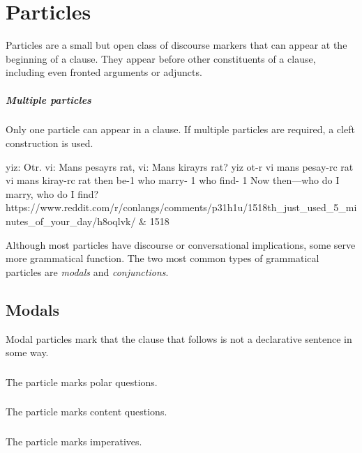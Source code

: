 \setchapterpreamble[u]{\margintoc}
\chapter{Particles}
Particles are a small but open class of discourse markers that can appear at the beginning of a clause. They appear before other constituents of a clause, including even fronted arguments or adjuncts.

\paragraph{Multiple particles}
Only one particle can appear in a clause. If multiple particles are required, a cleft construction is used.

\begin{example*}
    \script yiz: Otr. vi: Mans pesayrs rat, vi: Mans kirayrs rat?
    \bits  yiz ot-r vi mans pesay-rc rat vi mans kiray-rc rat
    \gloss then be-{1}  who marry- {1}  who find- {1}
    \tr Now then---who do I marry, who do I find?
    \smoyd https://www.reddit.com/r/conlangs/comments/p31h1u/1518th_just_used_5_minutes_of_your_day/h8oqlvk/ & 1518
\end{example*}  

Although most particles have discourse or conversational implications, some serve more grammatical function. The two most common types of grammatical particles are \emph{modals} and \emph{conjunctions}.

\section{Modals}
Modal particles mark that the clause that follows is not a declarative sentence in some way.

\subsection{}
The particle  marks polar questions.

\subsection{}
The particle  marks content questions.

\subsection{}
The particle  marks imperatives.

